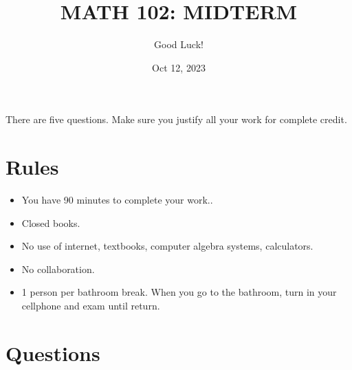 \documentclass[12pt]{amsart}
\title{ MATH 102: MIDTERM }
\author{Good Luck!}
\date{Oct 12, 2023}
\begin{document}
\maketitle


There are five questions. Make sure you justify all your work for complete credit.

\section*{Rules}

\begin{itemize}[leftmargin=*]
    \item You have 90  minutes to complete your work..
    \item Closed books.
    \item No use of internet, textbooks, computer algebra systems, calculators. 
    \item No collaboration.
    \item 1 person per bathroom break. When you go to the bathroom, turn in your cellphone and exam until return.
\end{itemize}

\newpage

\section*{Questions}
\end{document}
